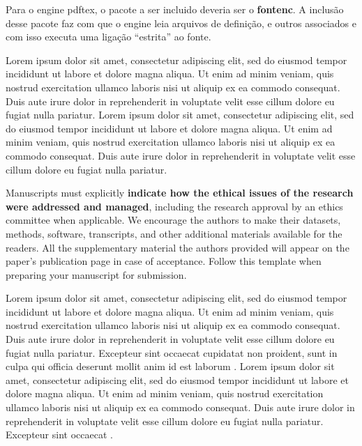 \documentclass[portuguese]{sbc2025}%
\begin{document}
Para o engine pdftex, o pacote a ser incluido deveria ser o \textbf{fontenc}. 
A inclusão desse pacote faz com que o engine leia arquivos de definição, e outros associados e com isso executa uma ligação ``estrita'' ao fonte.  

Lorem ipsum dolor sit amet, consectetur adipiscing elit, sed do eiusmod tempor incididunt ut labore et dolore magna aliqua. Ut enim ad minim veniam, quis nostrud exercitation ullamco laboris nisi ut aliquip ex ea commodo consequat. Duis aute irure dolor in reprehenderit in voluptate velit esse cillum dolore eu fugiat nulla pariatur.  Lorem ipsum dolor sit amet, consectetur adipiscing elit, sed do eiusmod tempor incididunt ut labore et dolore magna aliqua. Ut enim ad minim veniam, quis nostrud exercitation ullamco laboris nisi ut aliquip ex ea commodo consequat. Duis aute irure dolor in reprehenderit in voluptate velit esse cillum dolore eu fugiat nulla pariatur. 

\textcolor{blue!50!black}{%
Manuscripts must explicitly \textbf{indicate how the ethical issues of the research were addressed and managed}, including the research approval by an ethics committee when applicable. We encourage the authors to make their datasets, methods, software, transcripts, and other additional materials available for the readers. All the supplementary material the authors provided will appear on the paper's publication page in case of acceptance. Follow this template when preparing your manuscript for submission.}

Lorem ipsum dolor sit amet, consectetur adipiscing elit, sed do eiusmod tempor incididunt ut labore et dolore magna aliqua. Ut enim ad minim veniam, quis nostrud exercitation ullamco laboris nisi ut aliquip ex ea commodo consequat. Duis aute irure dolor in reprehenderit in voluptate velit esse cillum dolore eu fugiat nulla pariatur. Excepteur sint occaecat cupidatat non proident, sunt in culpa qui officia deserunt mollit anim id est laborum \citep{ref1}. Lorem ipsum dolor sit amet, consectetur adipiscing elit, sed do eiusmod tempor incididunt ut labore et dolore magna aliqua. Ut enim ad minim veniam, quis nostrud exercitation ullamco laboris nisi ut aliquip ex ea commodo consequat. Duis aute irure dolor in reprehenderit in voluptate velit esse cillum dolore eu fugiat nulla pariatur. Excepteur sint occaecat \citep{ref2}. 
\end{document}
